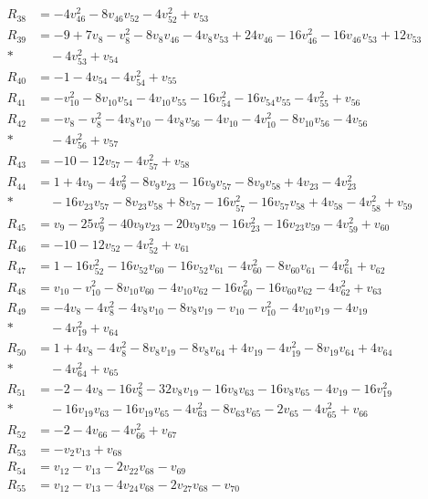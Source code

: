 \begin{align*}
R_{38}&=-4v_{46}^{2}-8v_{46}v_{52}-4v_{52}^{2}+v_{53}\\[2pt]
R_{39}&=-9+7v_{8}-v_{8}^{2}-8v_{8}v_{46}-4v_{8}v_{53}+24v_{46}-16v_{46}^{2}-16v_{46}v_{53}+12v_{53}\\*
&\quad-4v_{53}^{2}+v_{54}\\[2pt]
R_{40}&=-1-4v_{54}-4v_{54}^{2}+v_{55}\\[2pt]
R_{41}&=-v_{10}^{2}-8v_{10}v_{54}-4v_{10}v_{55}-16v_{54}^{2}-16v_{54}v_{55}-4v_{55}^{2}+v_{56}\\[2pt]
R_{42}&=-v_{8}-v_{8}^{2}-4v_{8}v_{10}-4v_{8}v_{56}-4v_{10}-4v_{10}^{2}-8v_{10}v_{56}-4v_{56}\\*
&\quad-4v_{56}^{2}+v_{57}\\[2pt]
R_{43}&=-10-12v_{57}-4v_{57}^{2}+v_{58}\\[2pt]
R_{44}&=1+4v_{9}-4v_{9}^{2}-8v_{9}v_{23}-16v_{9}v_{57}-8v_{9}v_{58}+4v_{23}-4v_{23}^{2}\\*
&\quad-16v_{23}v_{57}-8v_{23}v_{58}+8v_{57}-16v_{57}^{2}-16v_{57}v_{58}+4v_{58}-4v_{58}^{2}+v_{59}\\[2pt]
R_{45}&=v_{9}-25v_{9}^{2}-40v_{9}v_{23}-20v_{9}v_{59}-16v_{23}^{2}-16v_{23}v_{59}-4v_{59}^{2}+v_{60}\\[2pt]
R_{46}&=-10-12v_{52}-4v_{52}^{2}+v_{61}\\[2pt]
R_{47}&=1-16v_{52}^{2}-16v_{52}v_{60}-16v_{52}v_{61}-4v_{60}^{2}-8v_{60}v_{61}-4v_{61}^{2}+v_{62}\\[2pt]
R_{48}&=v_{10}-v_{10}^{2}-8v_{10}v_{60}-4v_{10}v_{62}-16v_{60}^{2}-16v_{60}v_{62}-4v_{62}^{2}+v_{63}\\[2pt]
R_{49}&=-4v_{8}-4v_{8}^{2}-4v_{8}v_{10}-8v_{8}v_{19}-v_{10}-v_{10}^{2}-4v_{10}v_{19}-4v_{19}\\*
&\quad-4v_{19}^{2}+v_{64}\\[2pt]
R_{50}&=1+4v_{8}-4v_{8}^{2}-8v_{8}v_{19}-8v_{8}v_{64}+4v_{19}-4v_{19}^{2}-8v_{19}v_{64}+4v_{64}\\*
&\quad-4v_{64}^{2}+v_{65}\\[2pt]
R_{51}&=-2-4v_{8}-16v_{8}^{2}-32v_{8}v_{19}-16v_{8}v_{63}-16v_{8}v_{65}-4v_{19}-16v_{19}^{2}\\*
&\quad-16v_{19}v_{63}-16v_{19}v_{65}-4v_{63}^{2}-8v_{63}v_{65}-2v_{65}-4v_{65}^{2}+v_{66}\\[2pt]
R_{52}&=-2-4v_{66}-4v_{66}^{2}+v_{67}\\[2pt]
R_{53}&=-v_{2}v_{13}+v_{68}\\[2pt]
R_{54}&=v_{12}-v_{13}-2v_{22}v_{68}-v_{69}\\[2pt]
R_{55}&=v_{12}-v_{13}-4v_{24}v_{68}-2v_{27}v_{68}-v_{70}\\[2pt]

\end{align*}
